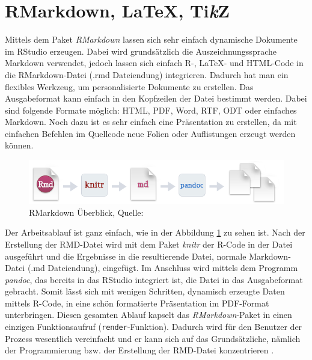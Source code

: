 \section{RMarkdown, \LaTeX, Ti\textit{k}Z}
\label{sec:RMarkdown}
Mittels dem Paket \emph{RMarkdown} lassen sich sehr einfach dynamische Dokumente im RStudio erzeugen. Dabei wird grundsätzlich die Auszeichnungssprache Markdown verwendet, jedoch lassen sich einfach R-, \LaTeX - und HTML-Code in die RMarkdown-Datei (.rmd Dateiendung) integrieren. Dadurch hat man ein flexibles Werkzeug, um personalisierte Dokumente zu erstellen. Das Ausgabeformat kann einfach in den Kopfzeilen der Datei bestimmt werden. Dabei sind folgende Formate möglich: HTML, PDF, Word, RTF, ODT oder einfaches Markdown. Noch dazu ist es sehr einfach eine Präsentation zu erstellen, da mit einfachen Befehlen im Quellcode neue Folien oder Auflistungen erzeugt werden können.

\begin{figure}[t]
\centering
\includegraphics[width=\ScaleIfNeeded]{pictures/RMarkdown}
\caption{RMarkdown Überblick, Quelle: \cite{rmarkdown}}
\label{pic:RMarkdown}
\end{figure}

Der Arbeitsablauf ist ganz einfach, wie in der Abbildung \ref{pic:RMarkdown} zu sehen ist. Nach der Erstellung der RMD-Datei wird mit dem Paket \emph{knitr} der R-Code in der Datei ausgeführt und die Ergebnisse in die resultierende Datei, normale Markdown-Datei (.md Dateiendung), eingefügt. Im Anschluss wird mittels dem Programm \emph{pandoc}, das bereits in das RStudio integriert ist, die Datei in das Ausgabeformat gebracht. Somit lässt sich mit wenigen Schritten, dynamisch erzeugte Daten mittels R-Code, in eine schön formatierte Präsentation im PDF-Format unterbringen. Diesen gesamten Ablauf kapselt das \emph{RMarkdown}-Paket in einen einzigen Funktionsaufruf (\texttt{render}-Funktion). Dadurch wird für den Benutzer der Prozess wesentlich vereinfacht und er kann sich auf das Grundsätzliche, nämlich der Programmierung bzw. der Erstellung der RMD-Datei konzentrieren \cite{rmarkdown}.

